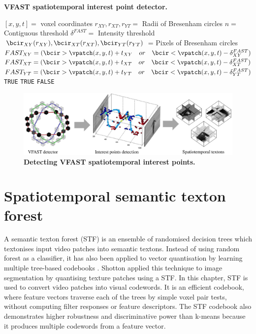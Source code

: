 \begin{algorithm}
	\caption{\textbf{VFAST spatiotemporal interest point detector.}}
\label{algo/act/vfast}
\begin{algorithmic}
	\REQUIRE $[x,y,t] = $ voxel coordinates
	\REQUIRE $r_{XY},r_{XT},r_{YT} = $ Radii of Bresenham circles
	\REQUIRE $n = $ Contiguous threshold
	\REQUIRE $\delta^{FAST} = $ Intensity threshold
	\STATE $\bcir_{XY}(r_{XY}),\bcir_{XT}(r_{XT}),\bcir_{YT}(r_{YT})$ = Pixels of Bresenham circles
	\STATE $FAST_{XY} = ( \bcir > \vpatch(x,y,t)+t_{XY}\quad or\quad \bcir < \vpatch(x,y,t)-\delta^{FAST}_{XY} )$
	\STATE $FAST_{XT} = ( \bcir > \vpatch(x,y,t)+t_{XT}\quad or\quad \bcir < \vpatch(x,y,t)-\delta^{FAST}_{XT} )$
	\STATE $FAST_{YT} = ( \bcir > \vpatch(x,y,t)+t_{YT}\quad or\quad \bcir < \vpatch(x,y,t)-\delta^{FAST}_{YT} )$
		\RETURN \texttt{TRUE}
		\RETURN \texttt{TRUE}
	\ELSE
		\RETURN \texttt{FALSE}
	\ENDIF
\ENDIF
\end{algorithmic}
\end{algorithm}
\fi 


\begin{figure}[ht]
	\centering
	\includegraphics[width=1\linewidth]{fig/act/fig2_new.pdf}
	\caption{\textbf{Detecting VFAST spatiotemporal interest points.}}
	\label{fig/act/fastest}
\end{figure}


\section{Spatiotemporal semantic texton forest}
\label{sec/act/stf}

A semantic texton forest (STF) is an ensemble of randomised decision trees which textonises input video patches into semantic textons. Instead of using random forest as a classifier, it has also been applied to vector quantisation by learning multiple tree-based codebooks \cite{Moosmann2007}. Shotton \etal \cite{Shotton2008} applied this technique to image segmentation by quantising texture patches using a STF. In this chapter, STF is used to convert video patches into visual codewords.  
It is an efficient codebook, where feature vectors traverse each of the trees by simple voxel pair tests, without computing filter responses or feature descriptors. The STF codebook also demonstrates higher robustness and discriminative power than k-means because it produces multiple codewords from a feature vector. 

